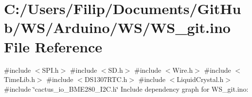 \hypertarget{_w_s__git_8ino}{}\section{C\+:/\+Users/\+Filip/\+Documents/\+Git\+Hub/\+W\+S/\+Arduino/\+W\+S/\+W\+S\+\_\+git.ino File Reference}
\label{_w_s__git_8ino}
{\ttfamily \#include $<$S\+P\+I.\+h$>$}\newline
{\ttfamily \#include $<$S\+D.\+h$>$}\newline
{\ttfamily \#include $<$Wire.\+h$>$}\newline
{\ttfamily \#include $<$Time\+Lib.\+h$>$}\newline
{\ttfamily \#include $<$D\+S1307\+R\+T\+C.\+h$>$}\newline
{\ttfamily \#include $<$Liquid\+Crystal.\+h$>$}\newline
{\ttfamily \#include \char`\"{}cactus\+\_\+io\+\_\+\+B\+M\+E280\+\_\+\+I2\+C.\+h\char`\"{}}\newline
Include dependency graph for W\+S\+\_\+git.\+ino\+:
